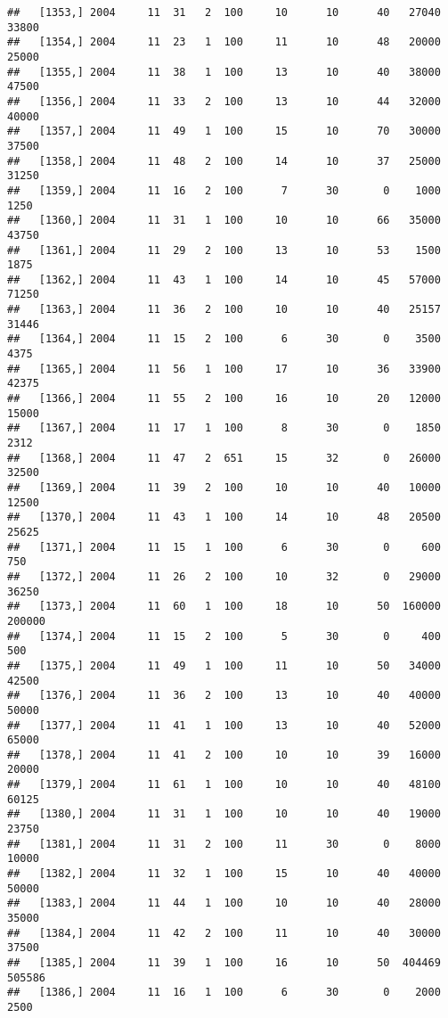 \documentclass{article}\usepackage[]{graphicx}\usepackage[]{color}
\makeatletter
\newenvironment{kframe}{%
 \def\at@end@of@kframe{}%
 \ifinner\ifhmode%
  \def\at@end@of@kframe{\end{minipage}}%
  \begin{minipage}{\columnwidth}%
 \fi\fi%
 \def\FrameCommand##1{\hskip\@totalleftmargin \hskip-\fboxsep
 \colorbox{shadecolor}{##1}\hskip-\fboxsep
     \hskip-\linewidth \hskip-\@totalleftmargin \hskip\columnwidth}%
 \MakeFramed {\advance\hsize-\width
   \@totalleftmargin\z@ \linewidth\hsize
   \@setminipage}}%
 {\par\unskip\endMakeFramed%
 \at@end@of@kframe}
\newenvironment{knitrout}{}{} %
\makeatother
\begin{document}
\begin{knitrout}
\begin{kframe}
\begin{verbatim}
##   [1353,] 2004     11  31   2  100     10      10      40   27040   33800
##   [1354,] 2004     11  23   1  100     11      10      48   20000   25000
##   [1355,] 2004     11  38   1  100     13      10      40   38000   47500
##   [1356,] 2004     11  33   2  100     13      10      44   32000   40000
##   [1357,] 2004     11  49   1  100     15      10      70   30000   37500
##   [1358,] 2004     11  48   2  100     14      10      37   25000   31250
##   [1359,] 2004     11  16   2  100      7      30       0    1000    1250
##   [1360,] 2004     11  31   1  100     10      10      66   35000   43750
##   [1361,] 2004     11  29   2  100     13      10      53    1500    1875
##   [1362,] 2004     11  43   1  100     14      10      45   57000   71250
##   [1363,] 2004     11  36   2  100     10      10      40   25157   31446
##   [1364,] 2004     11  15   2  100      6      30       0    3500    4375
##   [1365,] 2004     11  56   1  100     17      10      36   33900   42375
##   [1366,] 2004     11  55   2  100     16      10      20   12000   15000
##   [1367,] 2004     11  17   1  100      8      30       0    1850    2312
##   [1368,] 2004     11  47   2  651     15      32       0   26000   32500
##   [1369,] 2004     11  39   2  100     10      10      40   10000   12500
##   [1370,] 2004     11  43   1  100     14      10      48   20500   25625
##   [1371,] 2004     11  15   1  100      6      30       0     600     750
##   [1372,] 2004     11  26   2  100     10      32       0   29000   36250
##   [1373,] 2004     11  60   1  100     18      10      50  160000  200000
##   [1374,] 2004     11  15   2  100      5      30       0     400     500
##   [1375,] 2004     11  49   1  100     11      10      50   34000   42500
##   [1376,] 2004     11  36   2  100     13      10      40   40000   50000
##   [1377,] 2004     11  41   1  100     13      10      40   52000   65000
##   [1378,] 2004     11  41   2  100     10      10      39   16000   20000
##   [1379,] 2004     11  61   1  100     10      10      40   48100   60125
##   [1380,] 2004     11  31   1  100     10      10      40   19000   23750
##   [1381,] 2004     11  31   2  100     11      30       0    8000   10000
##   [1382,] 2004     11  32   1  100     15      10      40   40000   50000
##   [1383,] 2004     11  44   1  100     10      10      40   28000   35000
##   [1384,] 2004     11  42   2  100     11      10      40   30000   37500
##   [1385,] 2004     11  39   1  100     16      10      50  404469  505586
##   [1386,] 2004     11  16   1  100      6      30       0    2000    2500

\end{verbatim}
\end{kframe}
\end{knitrout}
\end{document}
